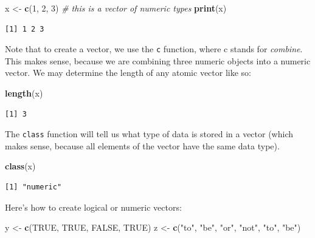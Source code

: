 \documentclass[
]{article}
\newenvironment{Shaded}{\begin{snugshade}}{\end{snugshade}}
\newcommand{\CommentTok}[1]{\textcolor[rgb]{0.56,0.35,0.01}{\textit{#1}}}
\newcommand{\DecValTok}[1]{\textcolor[rgb]{0.00,0.00,0.81}{#1}}
\newcommand{\KeywordTok}[1]{\textcolor[rgb]{0.13,0.29,0.53}{\textbf{#1}}}
\newcommand{\NormalTok}[1]{#1}
\newcommand{\OtherTok}[1]{\textcolor[rgb]{0.56,0.35,0.01}{#1}}
\newcommand{\StringTok}[1]{\textcolor[rgb]{0.31,0.60,0.02}{#1}}
\begin{document}
\begin{Shaded}
\begin{Highlighting}[]
\NormalTok{x <-}\StringTok{ }\KeywordTok{c}\NormalTok{(}\DecValTok{1}\NormalTok{, }\DecValTok{2}\NormalTok{, }\DecValTok{3}\NormalTok{)  }\CommentTok{# this is a vector of numeric types}
\KeywordTok{print}\NormalTok{(x)}
\end{Highlighting}
\end{Shaded}

\begin{verbatim}
[1] 1 2 3
\end{verbatim}

Note that to create a vector, we use the \texttt{c} function, where c stands for \emph{combine}.
This makes sense, because we are combining three numeric objects into a numeric vector.
We may determine the length of any atomic vector like so:

\begin{Shaded}
\begin{Highlighting}[]
\KeywordTok{length}\NormalTok{(x)}
\end{Highlighting}
\end{Shaded}

\begin{verbatim}
[1] 3
\end{verbatim}

The \texttt{class} function will tell us what type of data is stored in a vector (which makes sense, because all elements of the vector have the same data type).

\begin{Shaded}
\begin{Highlighting}[]
\KeywordTok{class}\NormalTok{(x)}
\end{Highlighting}
\end{Shaded}

\begin{verbatim}
[1] "numeric"
\end{verbatim}

Here's how to create logical or numeric vectors:

\begin{Shaded}
\begin{Highlighting}[]
\NormalTok{y <-}\StringTok{ }\KeywordTok{c}\NormalTok{(}\OtherTok{TRUE}\NormalTok{, }\OtherTok{TRUE}\NormalTok{, }\OtherTok{FALSE}\NormalTok{, }\OtherTok{TRUE}\NormalTok{)}
\NormalTok{z <-}\StringTok{ }\KeywordTok{c}\NormalTok{(}\StringTok{"to"}\NormalTok{, }\StringTok{"be"}\NormalTok{, }\StringTok{"or"}\NormalTok{, }\StringTok{"not"}\NormalTok{, }\StringTok{"to"}\NormalTok{, }\StringTok{"be"}\NormalTok{) }
\end{Highlighting}
\end{Shaded}
\end{document}
